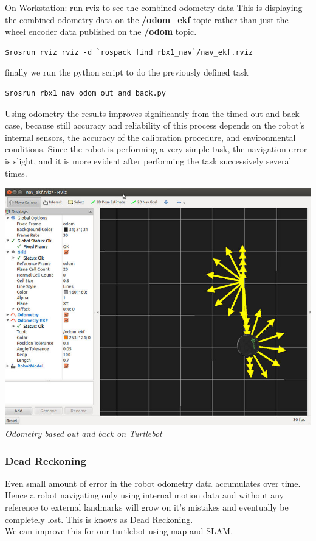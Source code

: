 \documentclass[10pt,a4paper]{article}
\begin{document}
On Workstation:
run rviz to see the combined odometry data
This is displaying the combined odometry data on the \textbf{/odom\_ekf} 
topic rather than just the wheel encoder data published on the \textbf{/odom} topic.
\begin{lstlisting}[frame=single] 
$rosrun rviz rviz -d `rospack find rbx1_nav`/nav_ekf.rviz
\end{lstlisting}

finally we run the python script to do the previously defined task 
\begin{lstlisting}[frame=single] 
$rosrun rbx1_nav odom_out_and_back.py
\end{lstlisting}

Using odometry the results improves significantly from the timed out-and-back case, because still accuracy and reliability of this process depends on the robot's internal sensors, the accuracy of the calibration procedure, and environmental conditions.
Since the robot is performing a very simple task, the navigation error is slight, and it is more evident after performing the task successively several times.

\begin{center}
\includegraphics[width=\textwidth]{images/odom_out_and_back.jpg}\\
\textit{Odometry based out and back on Turtlebot}
\end{center}

\subsubsection{Dead Reckoning}
Even small amount of error in the robot odometry data accumulates over time. Hence a robot navigating only using internal motion data and without any reference to external landmarks will grow on it's mistakes and eventually be completely lost. This is knows as Dead Reckoning. \\
We can improve this for our turtlebot using map and SLAM.
\end{document}
